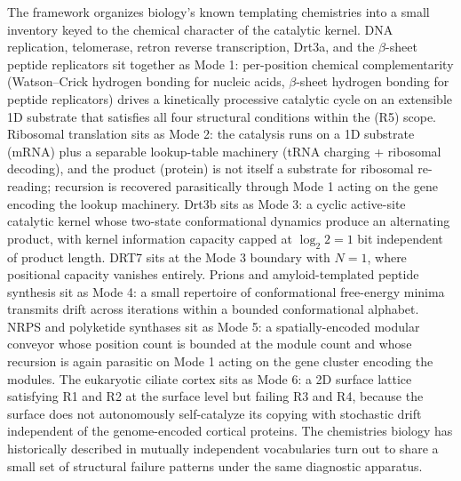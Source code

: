 \documentclass[aps,prx,reprint,amsmath,amssymb,floatfix,superscriptaddress,nofootinbib]{revtex4-2}
\theoremstyle{plain-thm}
\theoremstyle{definition-thm}
\begin{document}
The framework organizes biology's known templating chemistries into a small inventory keyed to the chemical character of the catalytic kernel. DNA replication, telomerase, retron reverse transcription, Drt3a, and the $\beta$-sheet peptide replicators \citep{Greenwald2016} sit together as Mode 1: per-position chemical complementarity (Watson--Crick hydrogen bonding for nucleic acids, $\beta$-sheet hydrogen bonding for peptide replicators) drives a kinetically processive catalytic cycle on an extensible 1D substrate that satisfies all four structural conditions within the (R5) scope. Ribosomal translation sits as Mode 2: the catalysis runs on a 1D substrate (mRNA) plus a separable lookup-table machinery (tRNA charging + ribosomal decoding), and the product (protein) is not itself a substrate for ribosomal re-reading; recursion is recovered parasitically through Mode 1 acting on the gene encoding the lookup machinery. Drt3b sits as Mode 3: a cyclic active-site catalytic kernel whose two-state conformational dynamics produce an alternating product, with kernel information capacity capped at $\log_2 2 = 1$ bit independent of product length. DRT7 sits at the Mode 3 boundary with $N = 1$, where positional capacity vanishes entirely. Prions and amyloid-templated peptide synthesis sit as Mode 4: a small repertoire of conformational free-energy minima transmits drift across iterations within a bounded conformational alphabet. NRPS and polyketide synthases sit as Mode 5: a spatially-encoded modular conveyor whose position count is bounded at the module count and whose recursion is again parasitic on Mode 1 acting on the gene cluster encoding the modules. The eukaryotic ciliate cortex sits as Mode 6: a 2D surface lattice satisfying R1 and R2 at the surface level but failing R3 and R4, because the surface does not autonomously self-catalyze its copying with stochastic drift independent of the genome-encoded cortical proteins. The chemistries biology has historically described in mutually independent vocabularies turn out to share a small set of structural failure patterns under the same diagnostic apparatus.
\end{document}
